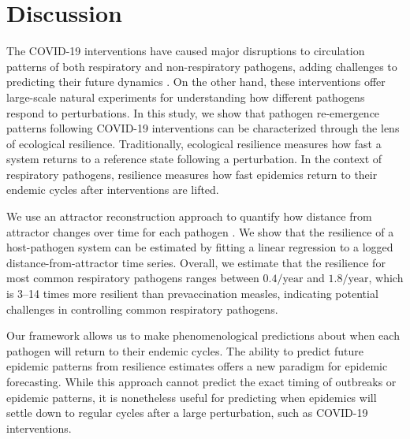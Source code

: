 \documentclass[12pt]{article}
\begin{document}
\section*{Discussion}

The COVID-19 interventions have caused major disruptions to circulation patterns of both respiratory and non-respiratory pathogens, adding challenges to predicting their future dynamics \citep{baker2020impact,gomez2021uncertain,koltai2022determinants,park2024predicting}.
On the other hand, these interventions offer large-scale natural experiments for understanding how different pathogens respond to perturbations.
In this study, we show that pathogen re-emergence patterns following COVID-19 interventions can be characterized through the lens of ecological resilience.
Traditionally, ecological resilience measures how fast a system returns to a reference state following a perturbation.
In the context of respiratory pathogens, resilience measures how fast epidemics return to their endemic cycles after interventions are lifted.

We use an attractor reconstruction approach to quantify how distance from attractor changes over time for each pathogen \citep{takens2006detecting}.
We show that the resilience of a host-pathogen system can be estimated by fitting a linear regression to a logged distance-from-attractor time series.
Overall, we estimate that the resilience for most common respiratory pathogens ranges between $0.4/\mathrm{year}$ and $1.8/\mathrm{year}$, which is 3--14 times more resilient than prevaccination measles, indicating potential challenges in controlling common respiratory pathogens.

Our framework allows us to make phenomenological predictions about when each pathogen will return to their endemic cycles.
The ability to predict future epidemic patterns from resilience estimates offers a new paradigm for epidemic forecasting.
While this approach cannot predict the exact timing of outbreaks or epidemic patterns, it is nonetheless useful for predicting when epidemics will settle down to regular cycles after a large perturbation, such as COVID-19 interventions.
\end{document}
